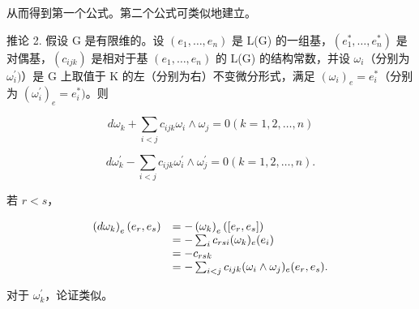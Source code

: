 从而得到第一个公式。第二个公式可类似地建立。

推论 2. 假设 G 是有限维的。设 \((e_1, \ldots, e_n)\) 是 L(G) 的一组基，\((e_1^*, \ldots, e_n^*)\) 是对偶基，\((c_{ijk})\) 是相对于基 \((e_1, \ldots, e_n)\) 的 L(G) 的结构常数，并设 \(\omega_i\)（分别为 \(\omega_i^{\prime})\)）是 G 上取值于 K 的左（分别为右）不变微分形式，满足 \((\omega_i)_e = e_i^*\)（分别为 \((\omega_i^{\prime})_e = e_i^*)\)。则

\[
d \omega_ {k} + \sum_ {i <   j} c _ {i j k} \omega_ {i} \wedge \omega_ {j} = 0 (k = 1, 2, \dots , n)
\]

\[
d \omega_ {k} ^ {\prime} - \sum_ {i <   j} c _ {i j k} \omega_ {i} ^ {\prime} \wedge \omega_ {j} ^ {\prime} = 0 (k = 1, 2, \dots , n).
\]

若 \(r < s\)，

\[
\begin{array}{r l} \left(d \omega_ {k}\right) _ {e} (e _ {r}, e _ {s}) & = - \left(\omega_ {k}\right) _ {e} ([ e _ {r}, e _ {s} ]) \\ & = - \sum_ {i} c _ {r s i} (\omega_ {k}) _ {e} (e _ {i}) \\ & = - c _ {r s k} \\ & = - \sum_ {i <   j} c _ {i j k} (\omega_ {i} \wedge \omega_ {j}) _ {e} (e _ {r}, e _ {s}). \end{array}
\]

对于 \(\omega_{k}^{\prime}\)，论证类似。

